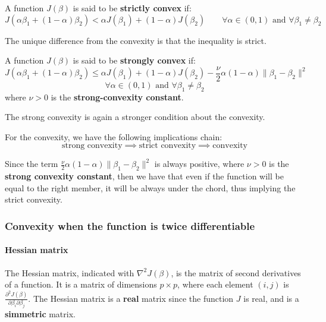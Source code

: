 \begin{definition}
    A function $J(\beta)$ is said to be \textbf{strictly convex} if:
    \[
        J(\alpha \beta_1 + (1-\alpha)\beta_2) < \alpha J(\beta_1) + (1-\alpha)J(\beta_2) \qquad \forall \alpha \in (0,1) \text{ and } \forall \beta_1 \neq \beta_2
    \]
\end{definition}

The unique difference from the convexity is that the inequality is strict.

\begin{definition}
    A function $J(\beta)$ is said to  be \textbf{strongly convex} if:
    \[
        J(\alpha \beta_1 + (1-\alpha)\beta_2) \leq \alpha J(\beta_1) + (1-\alpha)J(\beta_2) - \frac{\nu}{2} \alpha (1-\alpha) \| \beta_1 - \beta_2 \|^2
    \]
    \[
        \forall \alpha \in (0,1) \text{ and } \forall \beta_1 \neq \beta_2
    \]
    where $\nu >0 $ is the \textbf{strong-convexity constant}.
\end{definition}

The strong convexity is again a stronger condition about the convexity.

\begin{theorem}
    For the convexity, we have the following implications chain:
    \[
        \text{strong convexity} \implies \text{strict convexity} \implies \text{convexity}
    \]
\end{theorem}
Since the term $\frac{\nu}{2} \alpha (1-\alpha) \| \beta_1 - \beta_2 \|^2$ is always positive, where $\nu>0$ is the \textbf{strong convexity constant}, then we have that even if the function will be equal to the right member, it will be always under the chord, thus implying the strict convexity.

\subsubsection*{Convexity when the function is twice differentiable}
\paragraph*{Hessian matrix}
The Hessian matrix, indicated with $\nabla^2 J(\beta)$, is the matrix of second derivatives of a function. It is a matrix of dimensions $p \times p$, where each element $(i,j)$ is $\frac{\partial^2 J(\beta)}{\partial \beta_i \partial \beta_j}$.
The Hessian matrix is a \textbf{real} matrix since the function $J$ is real, and is a \textbf{simmetric} matrix.

